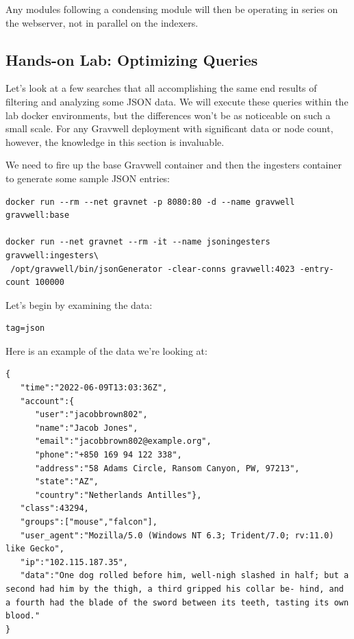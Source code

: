 Any modules following a condensing module will then be operating in
series on the webserver, not in parallel on the indexers.

\clearpage
\subsection{Hands-on Lab: Optimizing Queries}

Let's look at a few searches that all accomplishing the same end
results of filtering and analyzing some JSON data. We will execute these
queries within the lab docker environments, but the differences won't be
as noticeable on such a small scale. For any Gravwell deployment with
significant data or node count, however, the knowledge in this section
is invaluable.

We need to fire up the base Gravwell container and then the ingesters
container to generate some sample JSON entries:

\begin{Verbatim}[breaklines=true]
docker run --rm --net gravnet -p 8080:80 -d --name gravwell gravwell:base

docker run --net gravnet --rm -it --name jsoningesters gravwell:ingesters\
 /opt/gravwell/bin/jsonGenerator -clear-conns gravwell:4023 -entry-count 100000
\end{Verbatim}

Let's begin by examining the data:

\begin{Verbatim}
tag=json
\end{Verbatim}

Here is an example of the data we're looking at:

\begin{Verbatim}[breaklines=true]
{
   "time":"2022-06-09T13:03:36Z",
   "account":{
      "user":"jacobbrown802",
      "name":"Jacob Jones",
      "email":"jacobbrown802@example.org",
      "phone":"+850 169 94 122 338",
      "address":"58 Adams Circle, Ransom Canyon, PW, 97213",
      "state":"AZ",
      "country":"Netherlands Antilles"},
   "class":43294,
   "groups":["mouse","falcon"],
   "user_agent":"Mozilla/5.0 (Windows NT 6.3; Trident/7.0; rv:11.0) like Gecko",
   "ip":"102.115.187.35",
   "data":"One dog rolled before him, well-nigh slashed in half; but a second had him by the thigh, a third gripped his collar be- hind, and a fourth had the blade of the sword between its teeth, tasting its own blood."
}
\end{Verbatim}

